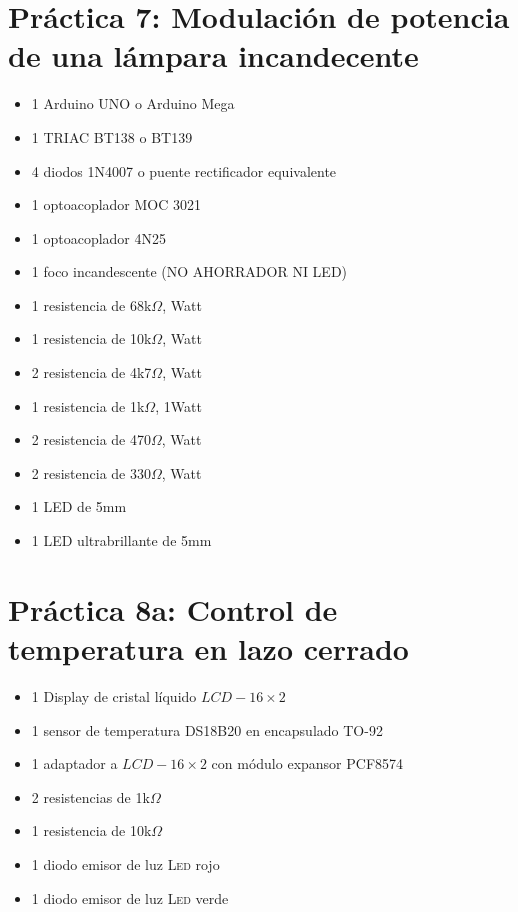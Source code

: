 \documentclass[letterpaper,10.5pt]{article}
\begin{document}
\section{Práctica 7: Modulación de potencia de una lámpara incandecente} %
\begin{itemize}[noitemsep]
	\item 1 Arduino UNO o Arduino Mega
	\item 1 TRIAC BT138 o BT139
	\item 4 diodos 1N4007 o puente rectificador equivalente
	\item 1 optoacoplador MOC 3021
	\item 1 optoacoplador 4N25
	\item 1 foco incandescente (NO AHORRADOR NI LED)
	\item 1 resistencia de 68k$\Omega$, Watt
	\item 1 resistencia de 10k$\Omega$, Watt
	\item 2 resistencia de 4k7$\Omega$, Watt
	\item 1 resistencia de  1k$\Omega$, 1Watt
	\item 2 resistencia de 470$\Omega$, Watt
	\item 2 resistencia de 330$\Omega$, Watt
	\item 1 LED de 5mm
	\item 1 LED ultrabrillante de 5mm
\end{itemize}



\section{Práctica 8a: Control de temperatura en lazo cerrado} %
\begin{itemize}[noitemsep]
	\item 1 Display de cristal líquido $LCD-16\times2$
	\item 1 sensor de temperatura DS18B20 en encapsulado TO-92
	\item 1 adaptador \IIC{} a $LCD-16\times2$ con módulo expansor PCF8574
	\item 2 resistencias de 1k$\Omega$
	\item 1 resistencia de 10k$\Omega$
	\item 1 diodo emisor de luz \textsc{Led} rojo
	\item 1 diodo emisor de luz \textsc{Led} verde
\end{itemize}
\end{document}
